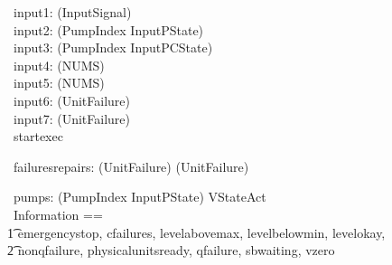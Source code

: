 \documentclass{report} %
\begin{document}
\begin{circus}


  \circchannel\ input1: (\power InputSignal) \\
  \circchannel\ input2: (PumpIndex \fun InputPState) \\ %
  \circchannel\ input3: (PumpIndex \fun InputPCState) \\ %
  \circchannel\ input4: (NUMS) \\ %
  \circchannel\ input5: (NUMS) \\ %
  \circchannel\ input6: (\power UnitFailure) \\ %
  \circchannel\ input7: (\power UnitFailure) \\ %

  \circchannel\ startexec \\ 
\end{circus}

\begin{circus}
   \circchannel\ failuresrepairs: (\power UnitFailure) \cross (\power UnitFailure)
\end{circus}

\begin{circus}
  \circchannel\ pumps: (PumpIndex \fun InputPState) \cross VStateAct \\
  \circchannelset\ Information ==  \\ \t1
    \lchanset emergencystop, cfailures, levelabovemax, levelbelowmin, levelokay, \\ \t2
              nonqfailure, physicalunitsready, qfailure, sbwaiting, vzero \rchanset
\end{circus}
\end{document}
